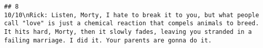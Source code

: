 \documentclass[
]{article}
\begin{document}
\begin{verbatim}
## 8                                                                                                                                                                                                                                                                                                                                                                                                                                                                                                                                                                                                                                                                                                                                                                                                                                                                                                                                                                                                                                                                                                                                                                                                                                                                                                                                                                                                                                                                                                                                                                                                                                                                                                                                                                                                                                                                                                                                                                                                                                                                                                                                                                         10/10\nRick: Listen, Morty, I hate to break it to you, but what people call "love" is just a chemical reaction that compels animals to breed. It hits hard, Morty, then it slowly fades, leaving you stranded in a failing marriage. I did it. Your parents are gonna do it.

\end{verbatim}
\end{document}
